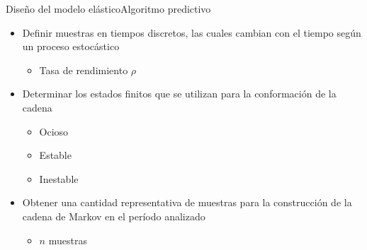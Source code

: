 \begin{frame}{Diseño del modelo elástico}{Algoritmo predictivo}
\begin{itemize}
	\item Definir muestras en tiempos discretos, las cuales cambian con el tiempo según un proceso estocástico
	\begin{itemize}
		\item Tasa de rendimiento $\rho$
	\end{itemize}
	\item Determinar los estados finitos que se utilizan para la conformación de la cadena
	\begin{itemize}
		\item Ocioso
		\item Estable
		\item Inestable
	\end{itemize}
	\item Obtener una cantidad representativa de muestras para la construcción de la cadena de Markov en el período analizado
	\begin{itemize}
		\item $n$ muestras
	\end{itemize}
\end{itemize}

\end{frame}


